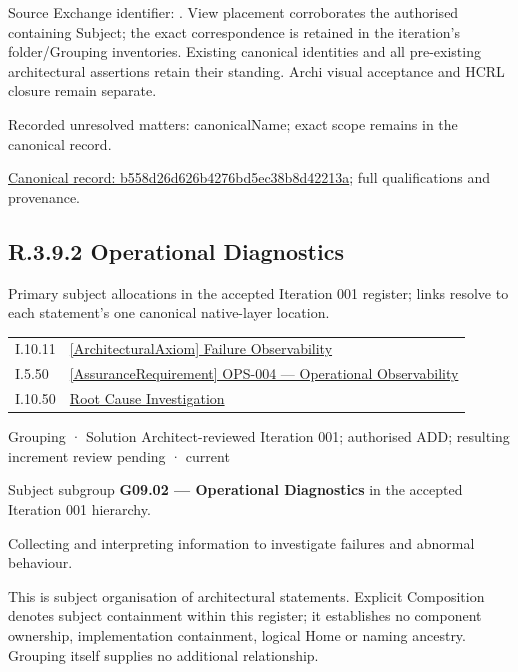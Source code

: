 Source Exchange identifier: \texttt{}. View placement corroborates
the authorised containing Subject; the exact correspondence is retained in the
iteration's folder/Grouping inventories. Existing canonical identities and all
pre-existing architectural assertions retain their standing. Archi visual
acceptance and HCRL closure remain separate.


{\small Recorded unresolved matters: canonicalName; exact scope remains in the canonical record.}\par
{\footnotesize \href{../../../../continuum/grouping/b558d26d626b4276bd5ec38b8d42213a.md}{Canonical record: b558d26d626b4276bd5ec38b8d42213a}; full qualifications and provenance.}\par
\subsection*{R.3.9.2 Operational Diagnostics}
\label{navigation:R.3.9.2}

Primary subject allocations in the accepted Iteration 001 register; links resolve to each statement’s one canonical native-layer location.\par
\begin{longtable}{p{.22\linewidth}p{.73\linewidth}}
I.10.11 & \hyperref[element:2ed20179a98d44a68880958155e47923]{[ArchitecturalAxiom] Failure Observability} \\
I.5.50 & \hyperref[element:b5d3447a05b249a8af154136fc36c4d9]{[AssuranceRequirement] OPS-004 — Operational Observability} \\
I.10.50 & \hyperref[element:9cdbf642158c4c37a6f3f10a6dd9ebfe]{Root Cause Investigation} \\
\end{longtable}
\label{element:45cb08d300b74853b456f333572a2bf6}
{\small Grouping · Solution Architect-reviewed Iteration 001; authorised ADD; resulting increment review pending · current}\par

Subject subgroup \textbf{G09.02 — Operational Diagnostics} in the accepted Iteration 001 hierarchy.



Collecting and interpreting information to investigate failures and abnormal behaviour.



This is subject organisation of architectural statements. Explicit Composition denotes subject containment within this register; it establishes no component ownership, implementation containment, logical Home or naming ancestry. Grouping itself supplies no additional relationship.


